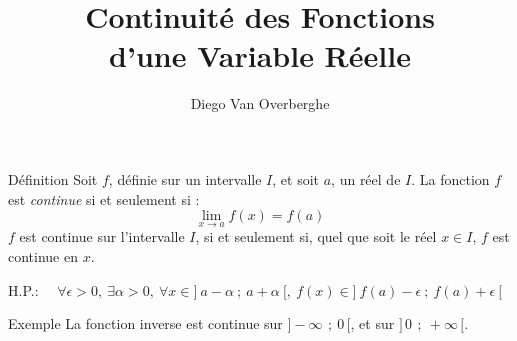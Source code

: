 \documentclass{cours}
\title{Continuité des Fonctions \\ d'une Variable Réelle}
\author{Diego Van Overberghe}
\begin{document}

    \begin{Gpartie}{Définition}
        Soit $f$, définie sur un intervalle $I$, et soit $a$, un réel de $I$.
        La fonction $f$ est \emph{continue} si et seulement si : \[\boxed{\lim_{x \to a} f(x)=f(a)}\]
        $f$ est continue sur l'intervalle $I$, si et seulement si, quel que soit le réel $x\in I$, $f$ est continue en $x$.

        H.P.: $\quad\forall\epsilon >0,~\exists\alpha >0,~\forall x\in\big]~a-\alpha~;~a+\alpha~\big[,~f(x)\in\big]~f(a)-\epsilon~;~f(a)+\epsilon~\big[$
        \begin{Spartie}{Exemple}
            La fonction inverse est continue sur $\big]-\infty\,~;~0\,\big[$, et sur $\big]\,0\,~;~+\infty\,\big[$.


\end{Spartie}
\end{Gpartie}
\end{document}
